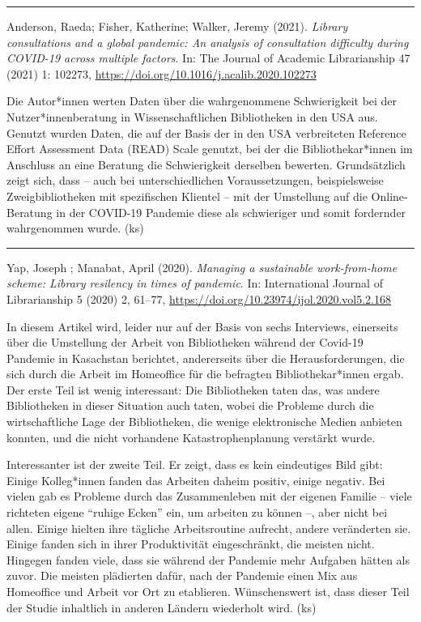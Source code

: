 \documentclass[a4paper,
fontsize=11pt,
oneside,
numbers=noperiodatend,
parskip=half-,
bibliography=totoc,
final
]{scrartcl}
\begin{document}
\begin{center}\rule{0.5\linewidth}{0.5pt}\end{center}

Anderson, Raeda; Fisher, Katherine; Walker, Jeremy (2021). \emph{Library
consultations and a global pandemic: An analysis of consultation
difficulty during COVID-19 across multiple factors}. In: The Journal of
Academic Librarianship 47 (2021) 1: 102273,
\url{https://doi.org/10.1016/j.acalib.2020.102273}

Die Autor*innen werten Daten über die wahrgenommene Schwierigkeit bei
der Nutzer*innen\-beratung in Wissenschaftlichen Bibliotheken in den USA
aus. Genutzt wurden Daten, die auf der Basis der in den USA verbreiteten
Reference Effort Assessment Data (READ) Scale genutzt, bei der die
Bibliothekar*innen im Anschluss an eine Beratung die Schwierigkeit
derselben bewerten. Grundsätzlich zeigt sich, dass -- auch bei
unterschiedlichen Voraussetzungen, beispielsweise Zweigbibliotheken mit
spezifischen Klientel -- mit der Umstellung auf die Online-Beratung in
der COVID-19 Pandemie diese als schwieriger und somit fordernder
wahrgenommen wurde. (ks)

\begin{center}\rule{0.5\linewidth}{0.5pt}\end{center}

Yap, Joseph ; Manabat, April (2020). \emph{Managing a sustainable
work-from-home scheme: Library resilency in times of pandemic}. In:
International Journal of Librarianship 5 (2020) 2, 61--77,
\url{https://doi.org/10.23974/ijol.2020.vol5.2.168}

In diesem Artikel wird, leider nur auf der Basis von sechs Interviews,
einerseits über die Umstellung der Arbeit von Bibliotheken während der
Covid-19 Pandemie in Kasachstan berichtet, andererseits über die
Herausforderungen, die sich durch die Arbeit im Homeoffice für die
befragten Bibliothekar*innen ergab. Der erste Teil ist wenig
interessant: Die Bibliotheken taten das, was andere Bibliotheken in
dieser Situation auch taten, wobei die Probleme durch die
wirtschaftliche Lage der Bibliotheken, die wenige elektronische Medien
anbieten konnten, und die nicht vorhandene Katastrophenplanung verstärkt
wurde.

Interessanter ist der zweite Teil. Er zeigt, dass es kein eindeutiges
Bild gibt: Einige Kolleg*innen fanden das Arbeiten daheim positiv,
einige negativ. Bei vielen gab es Probleme durch das Zusammenleben mit
der eigenen Familie -- viele richteten eigene \enquote{ruhige Ecken}
ein, um arbeiten zu können --, aber nicht bei allen. Einige hielten ihre
tägliche Arbeitsroutine aufrecht, andere veränderten sie. Einige fanden
sich in ihrer Produktivität eingeschränkt, die meisten nicht. Hingegen
fanden viele, dass sie während der Pandemie mehr Aufgaben hätten als
zuvor. Die meisten plädierten dafür, nach der Pandemie einen Mix aus
Homeoffice und Arbeit vor Ort zu etablieren. Wünschenswert ist, dass
dieser Teil der Studie inhaltlich in anderen Ländern wiederholt wird.
(ks)
\end{document}
